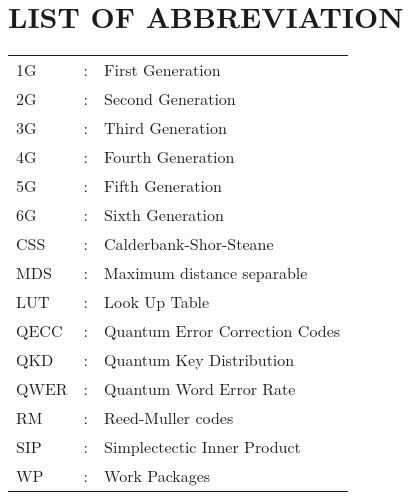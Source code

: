 \chapter*{LIST OF ABBREVIATION}
\begin{tabular}{lll}
1G &:& First Generation \\
2G &:& Second Generation \\
3G &:& Third Generation \\
4G &:& Fourth Generation \\
5G &:& Fifth Generation \\
6G &:& Sixth Generation \\
CSS &:& Calderbank-Shor-Steane\\
MDS &:& Maximum distance separable\\
LUT &:& Look Up Table\\
QECC &:& Quantum Error Correction Codes\\
QKD &:& Quantum Key Distribution\\
QWER &:& Quantum Word Error Rate\\
RM &:& Reed-Muller codes\\
SIP &:& Simplectectic Inner Product\\
WP &:& Work Packages\\

\end{tabular}